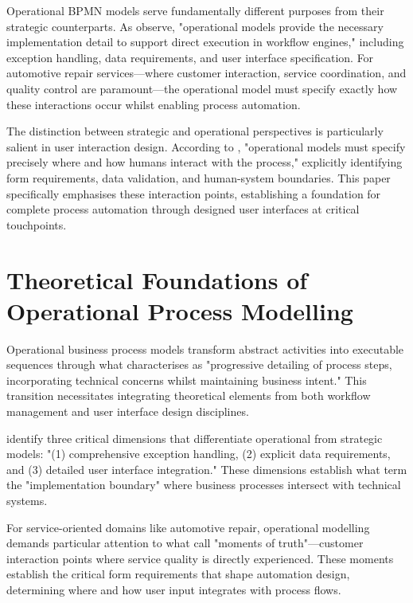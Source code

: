 \documentclass[14pt,a4paper]{article}
\begin{document}
Operational BPMN models serve fundamentally different purposes from their strategic counterparts. As \textit{\parencite[p. 178]{Dumas2018}} observe, "operational models provide the necessary implementation detail to support direct execution in workflow engines," including exception handling, data requirements, and user interface specification. For automotive repair services—where customer interaction, service coordination, and quality control are paramount—the operational model must specify exactly how these interactions occur whilst enabling process automation.

The distinction between strategic and operational perspectives is particularly salient in user interaction design. According to \textit{\parencite[p. 62]{Peffers2018}}, "operational models must specify precisely where and how humans interact with the process," explicitly identifying form requirements, data validation, and human-system boundaries. This paper specifically emphasises these interaction points, establishing a foundation for complete process automation through designed user interfaces at critical touchpoints.

\section{Theoretical Foundations of Operational Process Modelling}

Operational business process models transform abstract activities into executable sequences through what \textit{\parencite[p. 329]{Weske2019}} characterises as "progressive detailing of process steps, incorporating technical concerns whilst maintaining business intent." This transition necessitates integrating theoretical elements from both workflow management and user interface design disciplines.

\textit{\parencite[p. 143]{Rodriguez-Dominguez2022}} identify three critical dimensions that differentiate operational from strategic models: "(1) comprehensive exception handling, (2) explicit data requirements, and (3) detailed user interface integration." These dimensions establish what \textit{\parencite[p. 92]{LaCruz2021}} term the "implementation boundary" where business processes intersect with technical systems.

For service-oriented domains like automotive repair, operational modelling demands particular attention to what \textit{\parencite[p. 217]{Dumas2018}} call "moments of truth"—customer interaction points where service quality is directly experienced. These moments establish the critical form requirements that shape automation design, determining where and how user input integrates with process flows.
\end{document}
